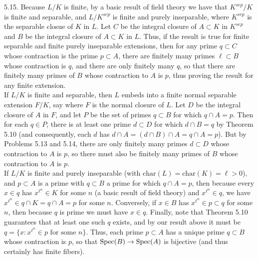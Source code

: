 \documentclass[11pt]{article}
\begin{document}
\num{5.15.} Because $L/K$ is finite, by a basic result of field theory we
have that $K^{sep}/K$ is finite and separable, and $L/K^{sep}$ is finite
and purely inseparable, where $K^{sep}$ is the separable closue of $K$ in
$L$. Let $C$ be the integral closure of $A\subset K$ in $K^{sep}$ and $B$
be the integral closure of $A\subset K$ in $L$. Thus, if the result is true
for finite separable and finite purely inseparable extensions, then for any
prime $q
\subset C$ whose contraction is the prime $p\subset A$, there are finitely
many primes $\ell\subset B$ whose contraction is $q$, and there are only
finitely many $q$, so that there are finitely many primes of $B$ whose
contraction to $A$ is $p$, thus proving the result for any finite extension.\\

If $L/K$ is finite and separable, then $L$ embeds into a finite normal
separable extension $F/K$, say where $F$ is the normal closure of $L$. Let
$D$ be the integral closure of $A$ in $F$, and let $P$ be the set of
primes $q\subset B$ for which $q\cap A=p$. Then for each $q\in P$, there
is at least one prime $d\subset D$ for which $d\cap B=q$ by Theorem 5.10
(and consequently, each $d$ has $d\cap A= (d\cap B)\cap A=q\cap A=p$). But
by Problems 5.13 and 5.14, there are only finitely many primes $d\subset D$
whose contraction to $A$ is $p$, so there must also be finitely many primes
of $B$ whose contraction to $A$ is $p$.\\

If $L/K$ is finite and purely inseparable (with
$\text{char}(L)=\text{char}(K)=\ell>0$), and $p\subset A$ is a prime with
$q\subset B$ a prime for which $q\cap A=p$, then because every $x\in q$
has $x^{\ell^n}\in K$ for some $n$ (a basic result of field theory) and
$x^{\ell^n}\in q$, we have $x^{\ell^n}\in q\cap K=q\cap A=p$ for some
$n$. Conversely, if $x\in B$ has $x^{\ell^n}\in p\subset q$ for some $n$,
then because $q$ is prime we must have $x\in q$. Finally, note that Theorem
5.10 guarantees that at least one such $q$ exists, and by our result above
it must be $q=\{x:x^{\ell^n}\in p\text{ for some $n$}\}$. Thus, each prime
$p\subset A$ has a unique prime $q\subset B$ whose contraction is $p$,
so that $\operatorname{Spec}(B)\rightarrow\operatorname{Spec}(A)$ is bijective (and thus certainly has
finite fibers).
\end{document}
